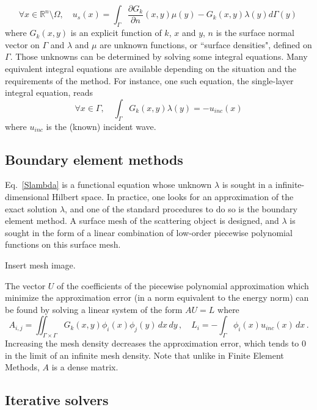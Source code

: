 \documentclass[]{article}
\begin{document}
\[\forall x \in \mathbb{R}^n \setminus{\Omega}, \quad u_s(x) =  \int_{\Gamma} \dfrac{\partial G_k}{\partial n}(x,y) \mu(y) -  G_k(x,y) \lambda(y) d\Gamma(y)\, \] 
where $G_k(x,y)$ is an explicit function of $k$, $x$ and $y$, $n$ is the surface normal vector on $\Gamma$ and $\lambda$ and $\mu$ are unknown functions, or ``surface densities", defined on $\Gamma$. Those unknowns can be determined by solving some integral equations. Many equivalent integral equations are available depending on the situation and the requirements of the method. For instance, one such equation, the single-layer integral equation, reads
\begin{equation}
	\label{Slambda}
 	\forall x \in \Gamma, \quad \int_{\Gamma} G_k(x,y) \lambda(y) = -u_{inc}(x)
\end{equation}
where $u_{inc}$ is the (known) incident wave. 

\subsection*{Boundary element methods}

Eq.~\eqref{Slambda} is a functional equation whose unknown $\lambda$ is sought in a infinite-dimensional Hilbert space. In practice, one looks for an approximation of the exact solution $\lambda$, and one of the standard procedures to do so is the boundary element method. A surface mesh of the scattering object is designed, and $\lambda$ is sought in the form of a linear combination of low-order piecewise polynomial functions on this surface mesh. 

{\color{red} Insert mesh image.}

The vector $U$ of the coefficients of the piecewise polynomial approximation which minimize the approximation error (in a norm equivalent to the energy norm) can be found by solving a linear system of the form $A U = L$ where
\[A_{i,j} = \iint_{\Gamma\times \Gamma} G_k(x,y) \phi_i(x) \phi_j(y) \,dx\,dy\,,\quad  L_i = -\int_{\Gamma} \phi_i(x) u_{inc}(x)\,dx\,. \]
Increasing the mesh density decreases the approximation error, which tends to $0$ in the limit of an infinite mesh density. Note that unlike in  Finite Element Methods, $A$ is a dense matrix. 

\subsection*{Iterative solvers}
\end{document}
